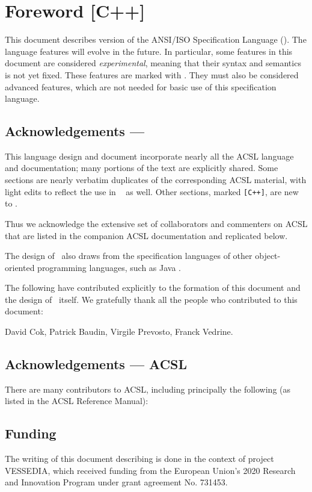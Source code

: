 \thispagestyle{plain}
\chapter*{Foreword [C++]}

This document describes version \acslppversion{}
of the ANSI/ISO \lang Specification Language (\NAME). 
The language features will evolve in the future. 
In particular, some features in this document
are considered \emph{experimental}, meaning that their syntax and
semantics is not yet fixed.  
These features are marked with
\experimental.  
They must also be considered advanced features,
which are not needed for basic use of this
specification language.

\section*{Acknowledgements --- \NAME}

This language design and document incorporate nearly all the 
ACSL language and documentation; many portions of the text
are explicitly shared. 
Some sections are nearly verbatim 
duplicates of the corresponding ACSL material, with light edits
to reflect the use in \NAME~ as well. 
Other sections, marked \texttt{[C++]}, are new to \NAME.

Thus we acknowledge the extensive
set of collaborators and commenters on ACSL that are listed
in the companion ACSL documentation and replicated below.

The design of \NAME~also draws from the specification
languages of other object-oriented programming languages,
such as Java \cite{leavens00jml}.

The following have contributed explicitly to the formation of
this document and the design of \NAME~itself.
We gratefully thank all the people who contributed to this document:

David Cok,
Patrick Baudin,
Virgile Prevosto,
Franck Vedrine.

\section*{Acknowledgements --- ACSL}
There are many contributors to ACSL, including principally the following
(as listed in the ACSL Reference Manual):


\section*{Funding}
The writing of this document describing \NAME is done in the context of
project VESSEDIA,
which  received funding from the European Union's 2020
Research and Innovation Program under grant agreement
No. 731453.
